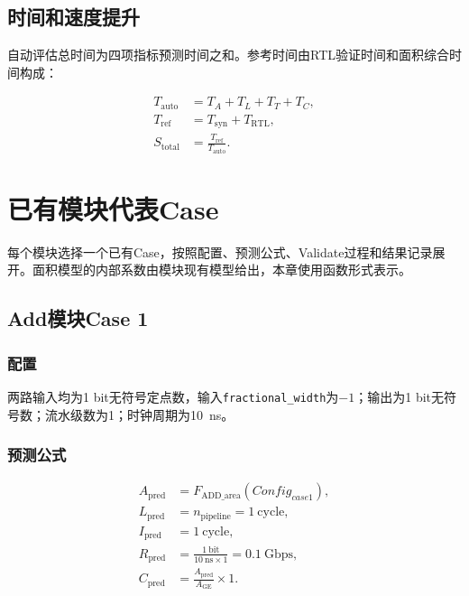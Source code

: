 \documentclass[a4paper,oneside,11pt]{ctexrep}
\begin{document}
\section{时间和速度提升}

自动评估总时间为四项指标预测时间之和。参考时间由RTL验证时间和面积综合时间构成：

\begin{align}
    T_{\mathrm{auto}} &= T_A+T_L+T_T+T_C,\\
    T_{\mathrm{ref}} &= T_{\mathrm{syn}}+T_{\mathrm{RTL}},\\
    S_{\mathrm{total}} &= \frac{T_{\mathrm{ref}}}{T_{\mathrm{auto}}}.
\end{align}

\chapter{已有模块代表Case}

每个模块选择一个已有Case，按照配置、预测公式、Validate过程和结果记录展开。面积模型的内部系数由模块现有模型给出，本章使用函数形式表示。

\section{Add模块Case 1}

\subsection{配置}

两路输入均为1 bit无符号定点数，输入\texttt{fractional\_width}为$-1$；输出为1 bit无符号数；流水级数为1；时钟周期为\SI{10}{\nano\second}。

\subsection{预测公式}

\begin{align}
    A_{\mathrm{pred}} &= F_{\mathrm{ADD\_area}}(Config_{case1}),\\
    L_{\mathrm{pred}} &= n_{\mathrm{pipeline}}=1\ \mathrm{cycle},\\
    I_{\mathrm{pred}} &= 1\ \mathrm{cycle},\\
    R_{\mathrm{pred}} &= \frac{1\ \mathrm{bit}}{10\ \mathrm{ns}\times1}=0.1\ \mathrm{Gbps},\\
    C_{\mathrm{pred}} &= \frac{A_{\mathrm{pred}}}{A_{\mathrm{GE}}}\times1.
\end{align}
\end{document}

